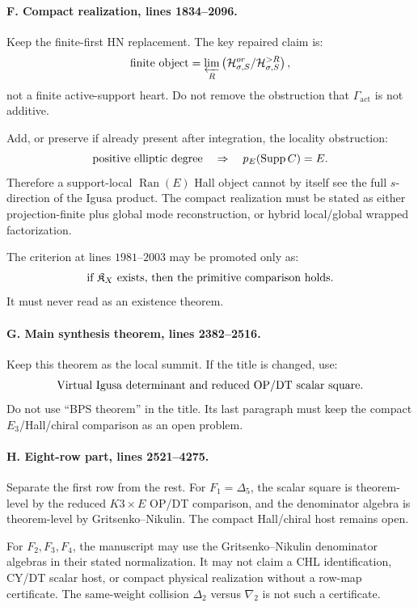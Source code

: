 \paragraph{F. Compact realization, lines 1834--2096.}
Keep the finite-first HN replacement.  The key repaired claim is:
\[
\hbox{finite object}=
\varprojlim_R
\left(\mathcal H_{\sigma,S}^{or}/\mathcal H_{\sigma,S}^{>R}\right),
\]
not a finite active-support heart.  Do not remove the obstruction that
\(\Gamma_{\mathrm{act}}\) is not additive.

Add, or preserve if already present after integration, the locality
obstruction:
\[
\hbox{positive elliptic degree}\quad\Rightarrow\quad
p_E(\operatorname{Supp}C)=E.
\]
Therefore a support-local \(\operatorname{Ran}(E)\) Hall object cannot
by itself see the full \(s\)-direction of the Igusa product.  The compact
realization must be stated as either projection-finite plus global
mode reconstruction, or hybrid local/global wrapped factorization.

The criterion at lines \(1981\)--\(2003\) may be promoted only as:
\[
\hbox{if }\mathfrak K_X\hbox{ exists, then the primitive comparison
holds.}
\]
It must never read as an existence theorem.

\paragraph{G. Main synthesis theorem, lines 2382--2516.}
Keep this theorem as the local summit.  If the title is changed, use:
\[
\hbox{Virtual Igusa determinant and reduced OP/DT scalar square}.
\]
Do not use ``BPS theorem'' in the title.  Its last paragraph must keep
the compact \(E_3\)/Hall/chiral comparison as an open problem.

\paragraph{H. Eight-row part, lines 2521--4275.}
Separate the first row from the rest.  For \(F_1=\Delta_5\), the
scalar square is theorem-level by the reduced \(K3\times E\) OP/DT
comparison, and the denominator algebra is theorem-level by
Gritsenko--Nikulin.  The compact Hall/chiral host remains open.

For \(F_2,F_3,F_4\), the manuscript may use the Gritsenko--Nikulin
denominator algebras in their stated normalization.  It may not claim a
CHL identification, CY/DT scalar host, or compact physical realization
without a row-map certificate.  The same-weight collision
\(\Delta_2\) versus \(\nabla_2\) is not such a certificate.

